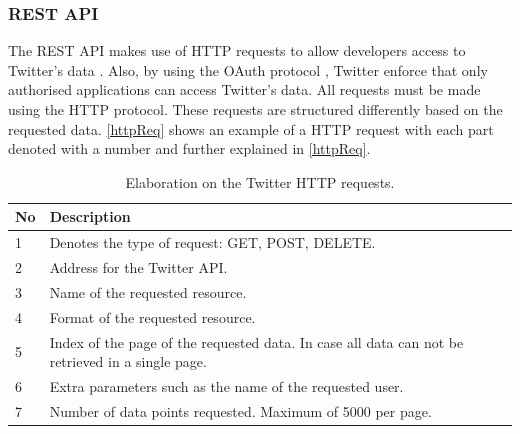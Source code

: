 \subsubsection{REST API}
The \ac{REST} \ac{API} makes use of \ac{HTTP} requests to allow developers
access to Twitter's data \citep{TwitterREST}. Also, by using the OAuth protocol
\citep{TwitterOAuth}, Twitter enforce that only authorised applications can
access Twitter's data. All requests must be made using the \ac{HTTP} protocol.
These requests are structured differently based on the requested data.
\autoref{httpReq} shows an example of a \ac{HTTP} request with each part denoted
with a number and further explained in \autoref{httpReq}.


\begin{table}[H] 
\begin{centering}
\begin{tabular}{|l|p{9cm}|l|}
\hline
\textbf{No}&	\textbf{Description}										\\\hline
1			&	Denotes the type of request: GET, POST, DELETE.				\\\hline
2			&	Address for the Twitter \ac{API}.							\\\hline
3			&	Name of the requested resource.	   							\\\hline
4			&	Format of the requested resource.							\\\hline
5			&	Index of the page of the requested data. In case all data can not be
retrieved in a single page.													\\\hline 
6			&	Extra parameters such as the name of the requested user.	\\\hline
7			&	Number of data points requested. Maximum of 5000 per page.	\\\hline
\end{tabular}
\caption{Elaboration on the Twitter HTTP requests.}
\label{httpElaboration}
\end{centering}
\end{table}
